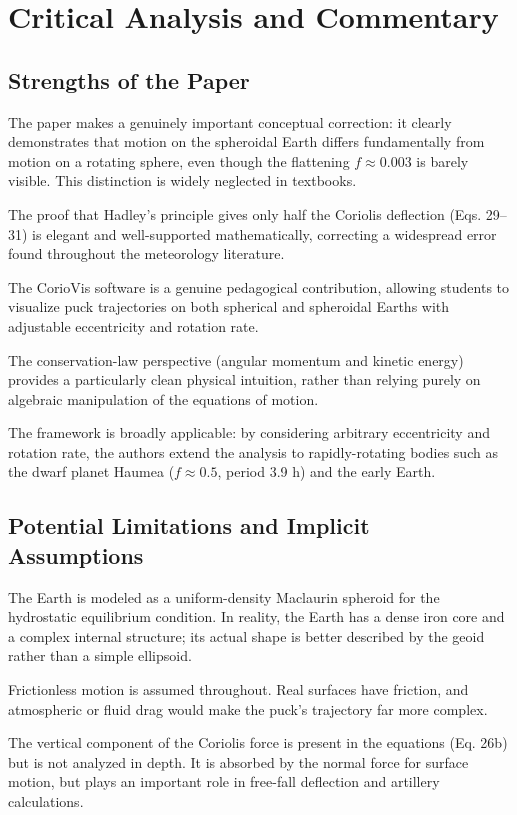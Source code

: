 \documentclass[10pt, a4paper]{article}
\begin{document}
\section{Critical Analysis and Commentary}
\subsection{Strengths of the Paper}
The paper makes a genuinely important conceptual correction: it clearly demonstrates that motion on the spheroidal Earth differs fundamentally from motion on a rotating sphere, even though the flattening $f \approx 0.003$ is barely visible. This distinction is widely neglected in textbooks. 

The proof that Hadley’s principle gives only half the Coriolis deflection (Eqs. 29–31) is elegant and well-supported mathematically, correcting a widespread error found throughout the meteorology literature. 

The CorioVis software is a genuine pedagogical contribution, allowing students to visualize puck trajectories on both spherical and spheroidal Earths with adjustable eccentricity and rotation rate. 

The conservation-law perspective (angular momentum and kinetic energy) provides a particularly clean physical intuition, rather than relying purely on algebraic manipulation of the equations of motion. 

The framework is broadly applicable: by considering arbitrary eccentricity and rotation rate, the authors extend the analysis to rapidly-rotating bodies such as the dwarf planet Haumea ($f \approx 0.5$, period 3.9 h) and the early Earth.

\subsection{Potential Limitations and Implicit Assumptions}
The Earth is modeled as a uniform-density Maclaurin spheroid for the hydrostatic equilibrium condition. In reality, the Earth has a dense iron core and a complex internal structure; its actual shape is better described by the geoid rather than a simple ellipsoid. 

Frictionless motion is assumed throughout. Real surfaces have friction, and atmospheric or fluid drag would make the puck’s trajectory far more complex. 

The vertical component of the Coriolis force is present in the equations (Eq. 26b) but is not analyzed in depth. It is absorbed by the normal force for surface motion, but plays an important role in free-fall deflection and artillery calculations. 
\end{document}
